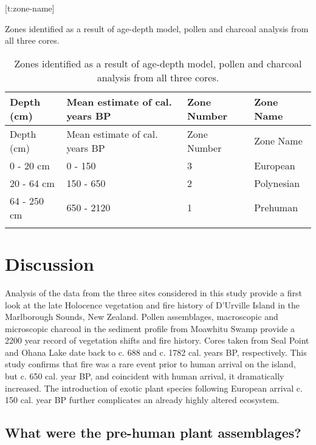 \documentclass[]{article}
\begin{document}
{[}t:zone-name{]}

Zones identified as a result of age-depth model, pollen and charcoal analysis from all three cores.

\begin{longtable}[]{@{}llll@{}}
\caption{Zones identified as a result of age-depth model, pollen and charcoal analysis from all three cores.}\tabularnewline
\toprule
Depth (cm) & Mean estimate of cal. years BP & Zone Number & Zone Name\tabularnewline
\midrule
\endfirsthead
\toprule
Depth (cm) & Mean estimate of cal. years BP & Zone Number & Zone Name\tabularnewline
\midrule
\endhead
0 - 20 cm & 0 - 150 & 3 & European\tabularnewline
20 - 64 cm & 150 - 650 & 2 & Polynesian\tabularnewline
64 - 250 cm & 650 - 2120 & 1 & Prehuman\tabularnewline
& & &\tabularnewline
\bottomrule
\end{longtable}

\section{Discussion}\label{discussion}

Analysis of the data from the three sites considered in this study provide a first look at the late Holocence vegetation and fire history of D'Urville Island in the Marlborough Sounds, New Zealand. Pollen assemblages, macroscopic and microscopic charcoal in the sediment profile from Moawhitu Swamp provide a 2200 year record of vegetation shifts and fire history. Cores taken from Seal Point and Ohana Lake date back to c. 688 and c. 1782 cal. years BP, respectively. This study confirms that fire was a rare event prior to human arrival on the island, but c. 650 cal. year BP, and coincident with human arrival, it dramatically increased. The introduction of exotic plant species following European arrival c. 150 cal. year BP further complicates an already highly altered ecosystem.

\subsection{What were the pre-human plant assemblages?}\label{what-were-the-pre-human-plant-assemblages}
\end{document}
